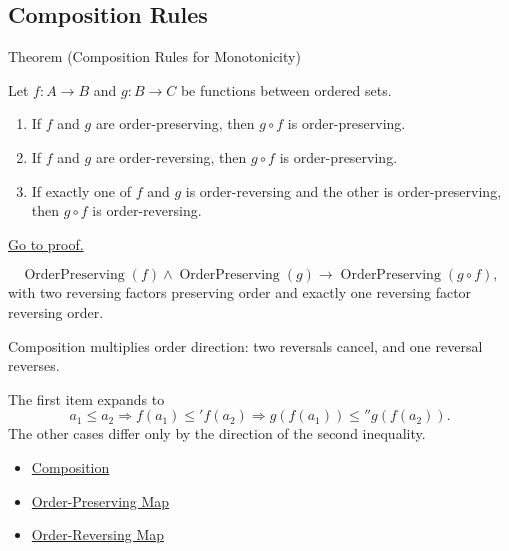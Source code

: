 \subsection*{Composition Rules}

\begin{theorembox}{Theorem (Composition Rules for Monotonicity)}
\begin{theorem}\label{thm:monotone-composition-rules}
Let $f:A\to B$ and $g:B\to C$ be functions between ordered sets.
\begin{enumerate}[label=(\roman*)]
\item If $f$ and $g$ are order-preserving, then $g\circ f$ is order-preserving.
\item If $f$ and $g$ are order-reversing, then $g\circ f$ is order-preserving.
\item If exactly one of $f$ and $g$ is order-reversing and the other is
order-preserving, then $g\circ f$ is order-reversing.
\end{enumerate}
\hyperref[prf:monotone-composition-rules]{Go to proof.}
\end{theorem}
\end{theorembox}

\begin{remark*}
\[
  \operatorname{OrderPreserving}(f)\wedge\operatorname{OrderPreserving}(g)
  \to \operatorname{OrderPreserving}(g\circ f),
\]
with two reversing factors preserving order and exactly one reversing factor
reversing order.
\end{remark*}

\begin{remark*}[Interpretation]
Composition multiplies order direction: two reversals cancel, and one reversal
reverses.
\end{remark*}

\begin{remark*}[Exposition]
The first item expands to
\[
a_1\leq a_2
\Longrightarrow
f(a_1)\leq' f(a_2)
\Longrightarrow
g(f(a_1))\leq'' g(f(a_2)).
\]
The other cases differ only by the direction of the second inequality.
\end{remark*}

\begin{dependencies}
\begin{itemize}
  \item \hyperref[def:composition]{Composition}
  \item \hyperref[def:order-preserving-map-ordered-sets]{Order-Preserving Map}
  \item \hyperref[def:order-reversing-map]{Order-Reversing Map}
\end{itemize}
\end{dependencies}
